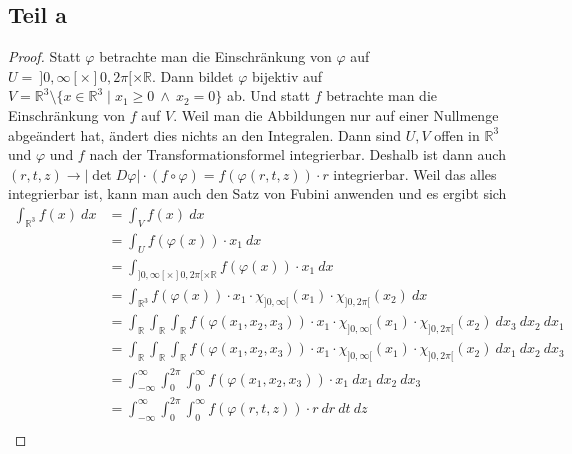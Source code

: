 \documentclass[10pt,a4paper]{article}
\begin{document}
\subsection{Teil a}
\begin{proof}
  Statt $\varphi$ betrachte man die Einschränkung von $\varphi$ auf $U =\ ]0, \infty[ \times ]0, 2\pi[ \times \mathbb{R}$.
  Dann bildet $\varphi$ bijektiv auf $V = \mathbb{R}^{3} \setminus \{ x \in \mathbb{R}^{3} \mid x_{1} \ge 0\ \land\ x_{2} = 0 \}$ ab.
  Und statt $f$ betrachte man die Einschränkung von $f$ auf $V$.
  Weil man die Abbildungen nur auf einer Nullmenge abgeändert hat, ändert dies nichts an den Integralen.
  Dann sind $U, V$ offen in $\mathbb{R}^{3}$ und $\varphi$ und $f$ nach der Transformationsformel integrierbar.
  Deshalb ist dann auch $(r, t, z) \rightarrow |\det D\varphi| \cdot (f \circ \varphi) = f(\varphi(r, t, z)) \cdot r$ integrierbar.
  Weil das alles integrierbar ist, kann man auch den Satz von Fubini anwenden und es ergibt sich
  \begin{align*}
    \int_{\mathbb{R}^{3}} f(x)\ dx & = \int_{V} f(x)\ dx\\
    & = \int_{U} f(\varphi(x)) \cdot x_{1}\ dx\\
    & = \int_{]0, \infty[ \times ]0, 2\pi[ \times \mathbb{R}} f(\varphi(x)) \cdot x_{1}\ dx\\
    & = \int_{\mathbb{R}^{3}} f(\varphi(x)) \cdot x_{1} \cdot \chi_{]0, \infty[}(x_{1}) \cdot \chi_{]0, 2\pi[}(x_{2})\ dx\\
    & = \int_{\mathbb{R}} \int_{\mathbb{R}} \int_{\mathbb{R}} f(\varphi(x_{1}, x_{2}, x_{3})) \cdot x_{1} \cdot \chi_{]0, \infty[}(x_{1}) \cdot \chi_{]0, 2\pi[}(x_{2})\ dx_{3}\ dx_{2}\ dx_{1}\\
    & = \int_{\mathbb{R}} \int_{\mathbb{R}} \int_{\mathbb{R}} f(\varphi(x_{1}, x_{2}, x_{3})) \cdot x_{1} \cdot \chi_{]0, \infty[}(x_{1}) \cdot \chi_{]0, 2\pi[}(x_{2})\ dx_{1}\ dx_{2}\ dx_{3}\\
    & = \int_{-\infty}^{\infty} \int_{0}^{2\pi} \int_{0}^{\infty} f(\varphi(x_{1}, x_{2}, x_{3})) \cdot x_{1}\ dx_{1}\ dx_{2}\ dx_{3}\\
    & = \int_{-\infty}^{\infty} \int_{0}^{2\pi} \int_{0}^{\infty} f(\varphi(r, t, z)) \cdot r\ dr\ dt\ dz\\
  \end{align*}
\end{proof}
\end{document}
